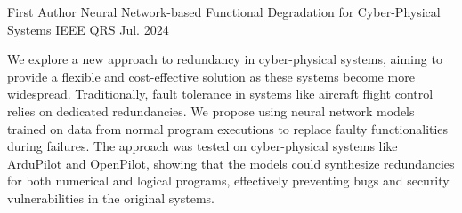 

\begin{cventries}

  \cventry
    {First Author} %
    {Neural Network-based Functional Degradation for Cyber-Physical Systems} %
    {IEEE QRS} %
    {Jul. 2024} %
    {
      We explore a new approach to redundancy in cyber-physical systems, aiming to provide a flexible and cost-effective solution as these systems become more widespread. Traditionally, fault tolerance in systems like aircraft flight control relies on dedicated redundancies. We propose using neural network models trained on data from normal program executions to replace faulty functionalities during failures. The approach was tested on cyber-physical systems like ArduPilot and OpenPilot, showing that the models could synthesize redundancies for both numerical and logical programs, effectively preventing bugs and security vulnerabilities in the original systems.
      \begin{cvitems} %
      \end{cvitems}
    }

\end{cventries}
